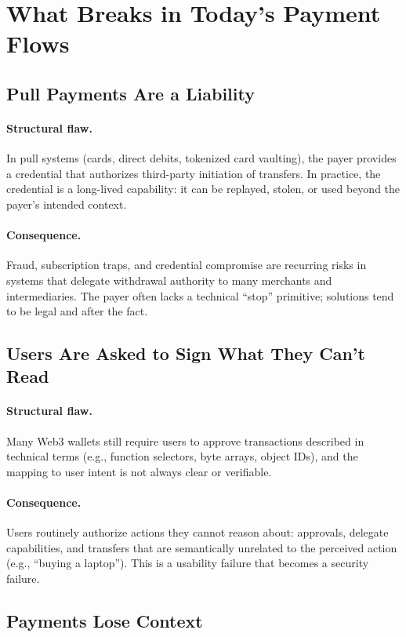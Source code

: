 \documentclass[11pt]{article}
\begin{document}
\section{What Breaks in Today's Payment Flows}
\subsection{Pull Payments Are a Liability}
\paragraph{Structural flaw.}
In pull systems (cards, direct debits, tokenized card vaulting), the payer provides a credential that authorizes third-party initiation of transfers. In practice, the credential is a long-lived capability: it can be replayed, stolen, or used beyond the payer's intended context.

\paragraph{Consequence.}
Fraud, subscription traps, and credential compromise are recurring risks in systems that delegate withdrawal authority to many merchants and intermediaries. The payer often lacks a technical ``stop'' primitive; solutions tend to be legal and after the fact.

\subsection{Users Are Asked to Sign What They Can't Read}
\paragraph{Structural flaw.}
Many Web3 wallets still require users to approve transactions described in technical terms (e.g., function selectors, byte arrays, object IDs), and the mapping to user intent is not always clear or verifiable.

\paragraph{Consequence.}
Users routinely authorize actions they cannot reason about: approvals, delegate capabilities, and transfers that are semantically unrelated to the perceived action (e.g., ``buying a laptop''). This is a usability failure that becomes a security failure.

\subsection{Payments Lose Context}
\end{document}
